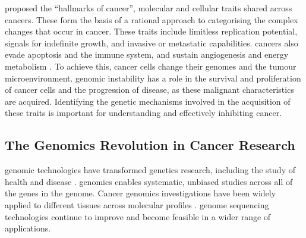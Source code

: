 \citet{Hanahan2000} proposed the ``hallmarks of cancer'', molecular and cellular traits shared across cancers. These form the basis of a rational approach to categorising the complex changes that occur in \gls{cancer}.  %
These traits include limitless replication potential, signals for indefinite growth, and invasive or metastatic capabilities. \Glspl{cancer} also evade apoptosis and the immune system, and sustain angiogenesis and energy metabolism \citep{Hanahan2011}. To achieve this, \gls{cancer} cells change their \glspl{genome} and the \gls{tumour} microenvironment. \Gls{genomic} instability has a role in the survival and proliferation of \gls{cancer} cells and the progression of  disease, as these malignant characteristics are acquired. Identifying the genetic mechanisms involved in the acquisition of these traits is important for understanding and effectively inhibiting \gls{cancer}. %


\subsection{The Genomics Revolution in Cancer Research}
\Gls{genomic} technologies have transformed genetics research, including the study of health and disease \citep{Lander2011, Goodwin2016}. \Glspl{genomic} enables systematic, unbiased studies across all of the genes in the \gls{genome}. Cancer \glspl{genomic} investigations have been widely applied to different tissues across \glspl{molecular profile} \citep{Bamford2004, ICGC2011, TCGA2013PAN}. \Gls{genome} sequencing technologies continue to improve and become  feasible in a wider range of applications.


